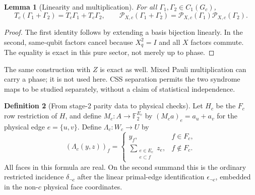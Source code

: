 \documentclass[11pt]{article}
\theoremstyle{definition}
\newtheorem{definition}{Definition}[section]
\theoremstyle{plain}
\newtheorem{lemma}[definition]{Lemma}
\theoremstyle{remark}
\newcommand{\F}{\mathbb F_2}
\newcommand{\eps}{\epsilon}
\begin{document}
\begin{lemma}[Linearity and multiplication]\label{lem:linearity}
For all $\Gamma_1,\Gamma_2\in C_1(G_c)$,
\[
 T_c(\Gamma_1+\Gamma_2)=T_c\Gamma_1+T_c\Gamma_2,\qquad
 \mathscr P_{X,c}(\Gamma_1+\Gamma_2)
    =\mathscr P_{X,c}(\Gamma_1)\mathscr P_{X,c}(\Gamma_2).
\]
\end{lemma}
\begin{proof}
The first identity follows by extending a basis bijection linearly.
In the second, same-qubit factors cancel because $X_q^2=I$ and
all $X$ factors commute. The equality is exact in this pure sector,
not merely up to phase.
\end{proof}
The same construction with $Z$ is exact as well.
Mixed Pauli multiplication can carry a phase; it is not used here.
CSS separation permits the two syndrome maps to be studied separately,
without a claim of statistical independence.

\begin{definition}[From stage-2 parity data to physical checks]
\label{def:syndromemap}
Let $H_c$ be the $F_c$ row restriction of $H$, and define
$M_c:A\to\F^{E_c}$ by
$(M_ca)_e=a_u+a_v$ for the physical edge $e=\{u,v\}$.
Define $\Lambda_c:W_c\to U$ by
\begin{equation}
 (\Lambda_c(y,z))_f=
 \begin{cases}
 y_f,& f\in F_c,\\
 \displaystyle\sum_{\substack{e\in E_c\\e\subset f}}z_e,
      & f\notin F_c .
 \end{cases}                                                  \label{eq:Lambda}
\end{equation}
All faces in this formula are real. On the second summand this is
the ordinary restricted incidence $\delta_{\neg c}$ after the
linear primal-edge identification $\eps_{\neg c}$, embedded in the
non-$c$ physical face coordinates.
\end{definition}
\end{document}

